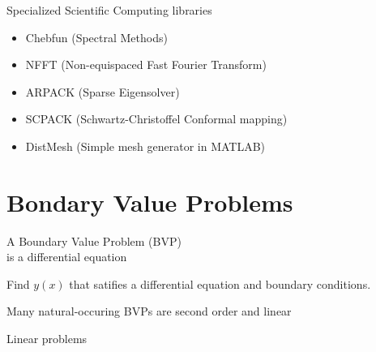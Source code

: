\documentclass[xcolor={dvipsnames}]{beamer}
\begin{document}
\begin{frame}{Specialized Scientific Computing libraries}{}

\begin{itemize}
\item Chebfun (Spectral Methods)
\item NFFT (Non-equispaced Fast Fourier Transform)
\item ARPACK (Sparse Eigensolver)
\item SCPACK (Schwartz-Christoffel Conformal mapping)
\item DistMesh (Simple mesh generator in MATLAB)

\end{itemize}
\end{frame}




\section{Bondary Value Problems}

\begin{frame}{A Boundary Value Problem (BVP) \\ is a differential equation}{}

Find $y(x)$ that satifies a differential equation and boundary conditions.
\end{frame}


\begin{frame}{Many natural-occuring BVPs are second order and linear}{}

Linear problems

\end{frame}
\end{document}
